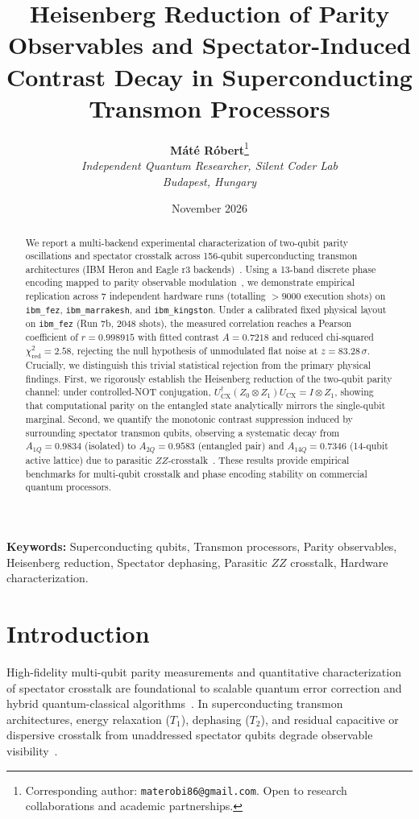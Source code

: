\documentclass[11pt,a4paper]{article}
\title{\textbf{Heisenberg Reduction of Parity Observables and Spectator-Induced Contrast Decay in Superconducting Transmon Processors}}
\author{
  \textbf{M\'at\'e R\'obert}\thanks{Corresponding author: \texttt{materobi86@gmail.com}. Open to research collaborations and academic partnerships.}\\
  \textit{Independent Quantum Researcher, Silent Coder Lab}\\
  \textit{Budapest, Hungary}
}
\date{November 2026}
\begin{document}
\maketitle

\begin{abstract}
We report a multi-backend experimental characterization of two-qubit parity oscillations and spectator crosstalk across 156-qubit superconducting transmon architectures (IBM Heron and Eagle r3 backends)~\cite{krantz_guide,blais_cqed}. Using a 13-band discrete phase encoding mapped to parity observable modulation~\cite{schuld2021encoding}, we demonstrate empirical replication across 7 independent hardware runs (totalling $>9000$ execution shots) on \texttt{ibm\_fez}, \texttt{ibm\_marrakesh}, and \texttt{ibm\_kingston}. Under a calibrated fixed physical layout on \texttt{ibm\_fez} (Run 7b, 2048 shots), the measured correlation reaches a Pearson coefficient of $r = 0.998915$ with fitted contrast $A = 0.7218$ and reduced chi-squared $\chi^2_{\text{red}} = 2.58$, rejecting the null hypothesis of unmodulated flat noise at $z = 83.28\,\sigma$. Crucially, we distinguish this trivial statistical rejection from the primary physical findings. First, we rigorously establish the Heisenberg reduction of the two-qubit parity channel: under controlled-NOT conjugation, $U_{\text{CX}}^{\dagger} (Z_0 \otimes Z_1) U_{\text{CX}} = I \otimes Z_1$, showing that computational parity on the entangled state analytically mirrors the single-qubit marginal. Second, we quantify the monotonic contrast suppression induced by surrounding spectator transmon qubits, observing a systematic decay from $A_{1Q} = 0.9834$ (isolated) to $A_{2Q} = 0.9583$ (entangled pair) and $A_{14Q} = 0.7346$ (14-qubit active lattice) due to parasitic $ZZ$-crosstalk~\cite{mundada2019crosstalk}. These results provide empirical benchmarks for multi-qubit crosstalk and phase encoding stability on commercial quantum processors.
\end{abstract}

\vspace{1em}
\noindent \textbf{Keywords:} Superconducting qubits, Transmon processors, Parity observables, Heisenberg reduction, Spectator dephasing, Parasitic $ZZ$ crosstalk, Hardware characterization.

\section{Introduction}
High-fidelity multi-qubit parity measurements and quantitative characterization of spectator crosstalk are foundational to scalable quantum error correction and hybrid quantum-classical algorithms~\cite{sackett2000,fowler2012surface}. In superconducting transmon architectures, energy relaxation ($T_1$), dephasing ($T_2$), and residual capacitive or dispersive crosstalk from unaddressed spectator qubits degrade observable visibility~\cite{krantz_guide,blais_cqed,sheldon2016cr}.
\end{document}
